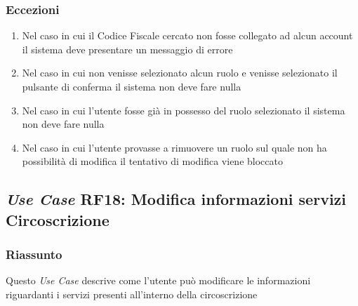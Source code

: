         \subsubsection{Eccezioni}
            \begin{enumerate}
                \item Nel caso in cui il Codice Fiscale cercato non fosse collegato ad alcun account il sistema deve presentare un messaggio di errore
                \item Nel caso in cui non venisse selezionato alcun ruolo e venisse selezionato il pulsante di conferma il sistema non deve fare nulla
                \item Nel caso in cui l'utente fosse già in possesso del ruolo selezionato il sistema non deve fare nulla
                \item Nel caso in cui l'utente provasse a rimuovere un ruolo sul quale non ha possibilità di modifica il tentativo di modifica viene bloccato
            \end{enumerate}

    \subsection{\textit{Use Case} RF18: Modifica informazioni servizi Circoscrizione}
        \subsubsection{Riassunto}
        Questo \textit{Use Case} descrive come l'utente può modificare le informazioni riguardanti i servizi presenti all'interno della circoscrizione
